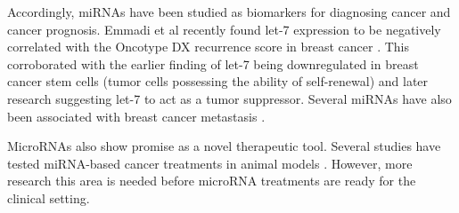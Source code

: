 Accordingly, miRNAs have been studied as biomarkers for diagnosing cancer and
cancer prognosis. Emmadi et al recently found let-7 expression to be negatively
correlated with the Oncotype DX recurrence score in breast cancer
\citep{Emmadi2015}. This corroborated with the earlier finding of let-7 being
downregulated in breast cancer stem cells (tumor cells possessing the ability
of self-renewal) \citep{Yu2007} and later research suggesting let-7 to act as
a tumor suppressor. Several miRNAs have also been associated with breast cancer
metastasis \citep{Chen2016}.

MicroRNAs also show promise as a novel therapeutic tool. Several studies have
tested miRNA-based cancer treatments in animal models \citep{VanRooij2014}.
However, more research this area is needed before microRNA treatments are
ready for the clinical setting.


